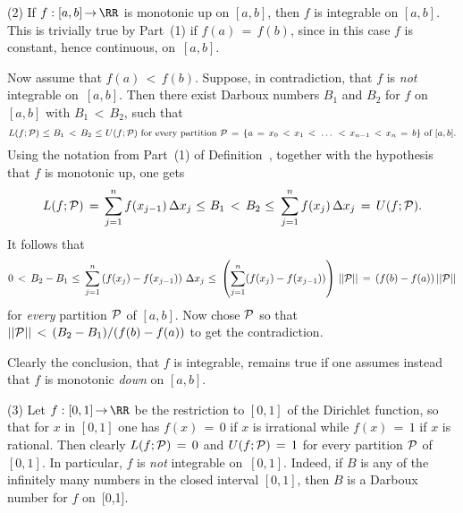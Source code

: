 \V

        (2) If $f:[a,b] \,{\rightarrow}\, {\RR}$ is monotonic up on $[a,b]$, then $f$ is integrable on $[a,b]$.
    This is trivially true by Part~(1) if $f(a) \,=\, f(b)$, since in this case $f$ is constant, hence continuous, on~$[a,b]$.

        Now assume that $f(a)\,<\,f(b)$. Suppose, in contradiction, that $f$ is {\em not} integrable on~$[a,b]$. Then there exist Darboux numbers
    $B_{1}$ and $B_{2}$ for $f$ on~$[a,b]$ with $B_{1}\,<\,B_{2}$, such that
        \begin{displaymath}
        L(f;{\cal P})\,\,{\leq}\,\,B_{1}\,<\,B_{2}\,\,{\leq}\,\,U(f;{\cal P}) \mbox{ for every partition ${\cal P} \,=\, \{a \,=\, x_{0}\,<\,x_{1}\,<\,\,{\ldots}\,\,<\,x_{n-1}\,<\,x_{n} \,=\, b\}$ of $[a,b]$}.
        \end{displaymath}
    Using the notation from Part~(1) of Definition~, together with the hypothesis that $f$ is monotonic up, one gets
        \begin{displaymath}
        L(f;{\cal P}) \,=\, \sum_{j=1}^{n} f(x_{j-1})\,{\Delta}x_{j}\,\,{\leq}\,\,B_{1}\,<\,B_{2}\,\,{\leq}\,\,\sum_{j=1}^{n} f(x_{j})\,{\Delta}x_{j} \,=\, U(f;{\cal P}).
        \end{displaymath}
    It follows that
        \begin{displaymath}
        0\,<\,B_{2}-B_{1}\,\,{\leq}\,\,\sum_{j=1}^{n} \left(f(x_{j})-f(x_{j-1})\right)\,{\Delta}x_{j}
    \,\,{\leq}\,\,
    \left(\sum_{j=1}^{n} (f(x_{j})-f(x_{j-1}))\right)\,||{\cal P}||
     \,=\, (f(b)-f(a))\,||{\cal P}||
        \end{displaymath}
    for {\em every} partition ${\cal P}$ of $[a,b]$. Now chose ${\cal P}$ so that $||{\cal P}||\,<\,(B_{2}-B_{1})/(f(b)-f(a))$ to get the contradiction.

        Clearly the conclusion, that $f$ is integrable, remains true if one assumes instead that $f$ is monotonic {\em down} on $[a,b]$.

\V

        (3) Let $f:[0,1] \,{\rightarrow}\, {\RR}$ be the restriction to $[0,1]$ of the Dirichlet function,
    so that for $x$ in $[0,1]$ one has $f(x) \,=\, 0$ if $x$ is irrational while $f(x) \,=\, 1$ if $x$ is rational.
    Then clearly $L(f;{\cal P}) \,=\, 0$ and $U(f;{\cal P}) \,=\, 1$ for every partition ${\cal P}$ of~$[0,1]$.
    In particular, $f$ is {\em not} integrable on~$[0,1]$. Indeed, if $B$ is any of the infinitely many numbers in the closed interval $[0,1]$, then $B$ is a Darboux number for $f$ on~[0,1].

